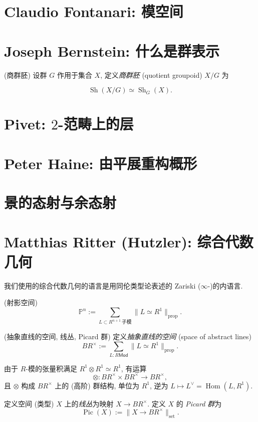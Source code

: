 \documentclass{article}
\begin{document}
	
	\section{Claudio Fontanari: 模空间}
	
	\section{Joseph Bernstein: 什么是群表示}
	\begin{definition}
		{(商群胚)}
		设群 $G$ 作用于集合 $X$, 定义\emph{商群胚} (quotient groupoid) $X/G$ 为
	\end{definition}
	
	\begin{prop}
		{}
		$$
		\operatorname{Sh}(X/G) \simeq \operatorname{Sh}_G (X).
		$$
	\end{prop}
	
	\section{Pivet: $2$-范畴上的层}
	
	
	\section{Peter Haine: 由平展\topos{}重构概形}
	
	
	
	
	\section{景的态射与余态射}
	
	\section{Matthias Ritter (Hutzler): 综合代数几何}
	
	我们使用的综合代数几何的语言是用同伦类型论表述的 Zariski ($\infty$-){\topos{}}的内语言.
	
	\begin{definition}
		{(射影空间)}
		$$
		\mathbb P^n := \sum_{L \subset R^{n+1}\,\text{子模}} \|L\simeq R^1 \|_{\text{prop}}.
		$$
	\end{definition}
	
	\begin{definition}
		{(抽象直线的空间, 线丛, Picard 群)}
		定义\emph{抽象直线的空间} (space of abstract lines)
		$$
		BR^\times := \sum_{L: R\mathsf{Mod}} \| L\simeq R^1\|_{\text{prop}}.
		$$
		
		由于 $R$-模的张量积满足 $R^1\otimes R^1\simeq R^1$, 有运算
		$$
		\otimes\colon BR^\times \times BR^\times \to BR^\times,
		$$
		且 $\otimes$ 构成 $BR^\times$ 上的 (高阶) 群结构, 单位为 $R^1$, 逆为 $L\mapsto L^\vee=\operatorname{Hom}(L,R^1)$.
		
		定义空间 (类型) $X$ 上的\emph{线丛}为映射 $X\to BR^\times$.
		定义 $X$ 的 \emph{Picard 群}为
		$$
		\operatorname{Pic}(X) := \|X\to BR^\times\|_{\text{set}}.
		$$
	\end{definition}
	
\end{document}
